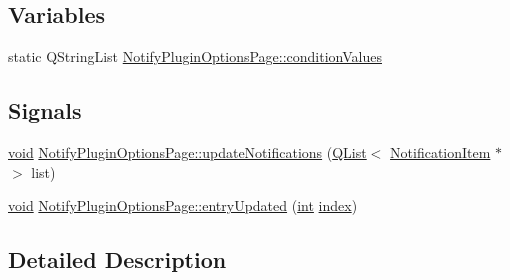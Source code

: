 \subsection*{Variables}
\begin{DoxyCompactItemize}
\item 
static Q\-String\-List \hyperlink{group__notify_ga9823971d5ab6a1e6f68073d8553a7414}{Notify\-Plugin\-Options\-Page\-::condition\-Values}
\end{DoxyCompactItemize}
\subsection*{Signals}
\begin{DoxyCompactItemize}
\item 
\hyperlink{group___u_a_v_objects_plugin_ga444cf2ff3f0ecbe028adce838d373f5c}{void} \hyperlink{group__notify_gadbd273176d3047b997383d3791fcf3aa}{Notify\-Plugin\-Options\-Page\-::update\-Notifications} (\hyperlink{class_q_list}{Q\-List}$<$ \hyperlink{class_notification_item}{Notification\-Item} $\ast$ $>$ list)
\item 
\hyperlink{group___u_a_v_objects_plugin_ga444cf2ff3f0ecbe028adce838d373f5c}{void} \hyperlink{group__notify_gacfc979fcc446bc951c04ba8741231190}{Notify\-Plugin\-Options\-Page\-::entry\-Updated} (\hyperlink{ioapi_8h_a787fa3cf048117ba7123753c1e74fcd6}{int} \hyperlink{glext_8h_ab47dd9958bcadea08866b42bf358e95e}{index})
\end{DoxyCompactItemize}


\subsection{Detailed Description}


